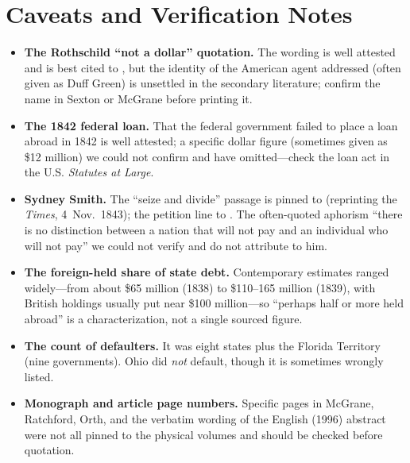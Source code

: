 \documentclass[12pt]{article}
\begin{document}
\section{Caveats and Verification Notes}
\label{sec:caveats}

\begin{itemize}
  \item \textbf{The Rothschild ``not a dollar'' quotation.} The wording is well
    attested and is best cited to \citet[39--40]{sexton2005debtor}, but the
    identity of the American agent addressed (often given as Duff Green) is
    unsettled in the secondary literature; confirm the name in Sexton or McGrane
    before printing it.
  \item \textbf{The 1842 federal loan.} That the federal government failed to place
    a loan abroad in 1842 is well attested; a specific dollar figure (sometimes
    given as \$12 million) we could not confirm and have omitted---check the loan
    act in the U.S. \emph{Statutes at Large}.
  \item \textbf{Sydney Smith.} The ``seize and divide'' passage is pinned to
    \citet[59]{mcgrane1935foreign} (reprinting the \emph{Times}, 4~Nov.\ 1843); the
    petition line to \citet[9]{sydneysmith1843letters}. The often-quoted aphorism
    ``there is no distinction between a nation that will not pay and an individual
    who will not pay'' we could not verify and do not attribute to him.
  \item \textbf{The foreign-held share of state debt.} Contemporary estimates
    ranged widely---from about \$65 million (1838) to \$110--165 million (1839),
    with British holdings usually put near \$100 million---so ``perhaps half or
    more held abroad'' is a characterization, not a single sourced figure.
  \item \textbf{The count of defaulters.} It was eight states plus the Florida
    Territory (nine governments). Ohio did \emph{not} default, though it is
    sometimes wrongly listed.
  \item \textbf{Monograph and article page numbers.} Specific pages in McGrane,
    Ratchford, Orth, and the verbatim wording of the English (1996) abstract were
    not all pinned to the physical volumes and should be checked before quotation.
\end{itemize}



\end{document}
